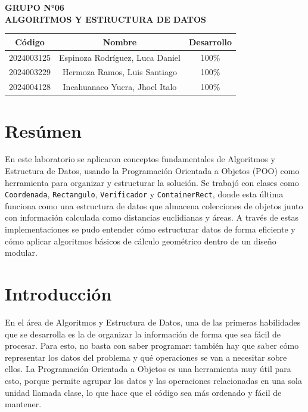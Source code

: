 \documentclass[12pt]{article}
\newcommand{\curso}{Algoritmos y Estructura de Datos}
\newcommand{\Ngrupo}{06}
\begin{document}
\setlength{\headheight}{15pt} %


\begin{center}
{\large\textbf{GRUPO N°\Ngrupo}} \\
{\large\textbf{\MakeTextUppercase{\curso}}} \\
\end{center}
\begin{table}[h]
    \centering
    \begin{tabular}{|c|c|c|}
        \hline
        \textbf{Código} & \textbf{Nombre} & \textbf{Desarrollo} \\ \hline
      2024003125 & Espinoza Rodríguez, Luca Daniel & 100\% \\ \hline
      2024003229 & Hermoza Ramos, Luis Santiago & 100\% \\ \hline
      2024004128 & Incahuanaco Yucra, Jhoel Italo & 100\% \\ \hline
      
    \end{tabular}
\end{table}


\newpage
\renewcommand{\contentsname}{Índice de Contenidos}
\tableofcontents

\newpage
\renewcommand{\listfigurename}{Índice de Figuras}
\listoffigures
\renewcommand{\listtablename}{Índice de Tablas}
\listoftables


\newpage
\section{Resúmen}
En este laboratorio se aplicaron conceptos fundamentales de 
Algoritmos y Estructura de Datos, usando la Programación 
Orientada a Objetos (POO) como herramienta para organizar y 
estructurar la solución. Se trabajó con clases como 
\texttt{Coordenada}, \texttt{Rectangulo}, \texttt{Verificador} 
y \texttt{ContainerRect}, donde esta última funciona como una 
estructura de datos que almacena colecciones de objetos junto 
con información calculada como distancias euclidianas y áreas. 
A través de estas implementaciones se pudo entender cómo 
estructurar datos de forma eficiente y cómo aplicar algoritmos 
básicos de cálculo geométrico dentro de un diseño modular.


\section{Introducción}
En el área de Algoritmos y Estructura de Datos, una de las 
primeras habilidades que se desarrolla es la de organizar la 
información de forma que sea fácil de procesar. Para esto, 
no basta con saber programar: también hay que saber cómo 
representar los datos del problema y qué operaciones se van 
a necesitar sobre ellos. La Programación Orientada a Objetos 
es una herramienta muy útil para esto, porque permite agrupar 
los datos y las operaciones relacionadas en una sola unidad 
llamada clase, lo que hace que el código sea más ordenado y 
fácil de mantener.
\end{document}
